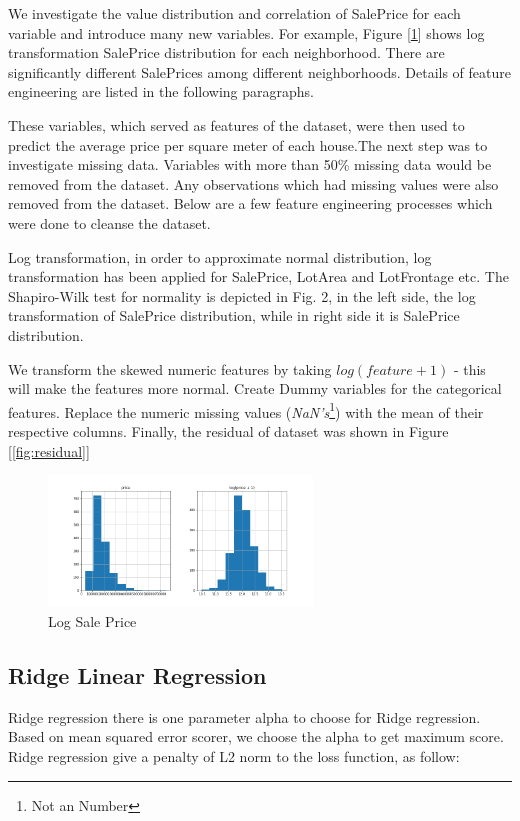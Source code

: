 \documentclass[11pt,a4paper]{article}
\begin{document}
We investigate the value distribution and correlation of SalePrice for each variable and introduce many new variables. For example, Figure [\ref{fig: price}] shows log transformation SalePrice distribution for each neighborhood. There are significantly different SalePrices among different neighborhoods. Details of feature engineering are listed in the following paragraphs.

These variables, which served as features of the dataset, were then used to predict the average price per square meter of each house.The next step was to investigate missing data. Variables with more than 50\% missing data would be removed from the dataset. Any observations which had missing values were also removed from the dataset. Below are a few feature engineering processes which were done to cleanse the dataset. 

Log transformation, in order to approximate normal distribution, log transformation has been applied for SalePrice, LotArea and LotFrontage etc. The Shapiro-Wilk test for normality is depicted in Fig. 2, in the left side, the log transformation of SalePrice distribution, while in right side it is SalePrice distribution. 

We transform the skewed numeric features by taking \(log(feature + 1)\) - this will make the features more normal. Create Dummy variables for the categorical features. Replace the numeric missing values (\emph{NaN's}\footnote{Not an Number}) with the mean of their respective columns. Finally, the residual of dataset was shown in Figure [\ref{fig:residual}]

\begin{figure}
    \centering
    \includegraphics[width=7cm]{images/price.png}
    \caption{Log Sale Price}
    \label{fig: price}
\end{figure}

\subsection{Ridge Linear Regression}

Ridge regression there is one parameter alpha to choose for Ridge regression. Based on mean squared error scorer, we choose the alpha to get maximum score. Ridge regression give a penalty of L2 norm to the loss function, as follow:
\end{document}

